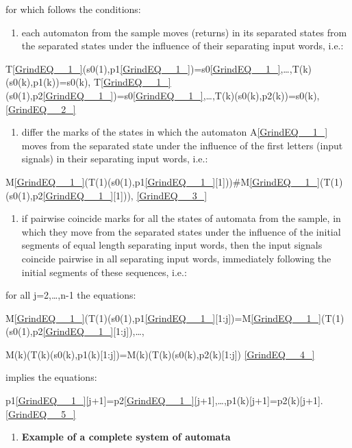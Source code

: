\documentclass{article}
\begin{document}
for which follows the conditions:

\begin{enumerate}
\item  each automaton from the sample moves (returns) in its separated states from the separated states under the influence of their separating input words, i.e.:
\end{enumerate}

T\eqref{GrindEQ__1_}(s0(1),p1\eqref{GrindEQ__1_})=s0\eqref{GrindEQ__1_},\dots ,T(k)(s0(k),p1(k))=s0(k), T\eqref{GrindEQ__1_}(s0(1),p2\eqref{GrindEQ__1_})=s0\eqref{GrindEQ__1_},\dots ,T(k)(s0(k),p2(k))=s0(k), \eqref{GrindEQ__2_}

\begin{enumerate}
\item  differ the marks of the states in which the automaton A\eqref{GrindEQ__1_} moves from the separated state under the influence of the first letters (input signals) in their separating input words, i.e.:
\end{enumerate}

M\eqref{GrindEQ__1_}(T(1)(s0(1),p1\eqref{GrindEQ__1_}[1]))\#M\eqref{GrindEQ__1_}(T(1)(s0(1),p2\eqref{GrindEQ__1_}[1])), \eqref{GrindEQ__3_}

\begin{enumerate}
\item  if pairwise coincide marks for all the states of automata from the sample, in which they move from the separated states under the influence of the initial segments of equal length separating input words, then the input signals coincide pairwise in all separating input words, immediately following the initial segments of these sequences, i.e.:
\end{enumerate}

for all j=2,\dots ,n-1 the equations:

M\eqref{GrindEQ__1_}(T(1)(s0(1),p1\eqref{GrindEQ__1_}[1:j])=M\eqref{GrindEQ__1_}(T(1)(s0(1),p2\eqref{GrindEQ__1_}[1:j]),\dots ,

M(k)(T(k)(s0(k),p1(k)[1:j])=M(k)(T(k)(s0(k),p2(k)[1:j]) \eqref{GrindEQ__4_}

implies the equations:

p1\eqref{GrindEQ__1_}[j+1]=p2\eqref{GrindEQ__1_}[j+1],\dots ,p1(k)[j+1]=p2(k)[j+1]. \eqref{GrindEQ__5_}

\begin{enumerate}
\item  \textbf{Example of a complete system of automata}
\end{enumerate}
\end{document}
